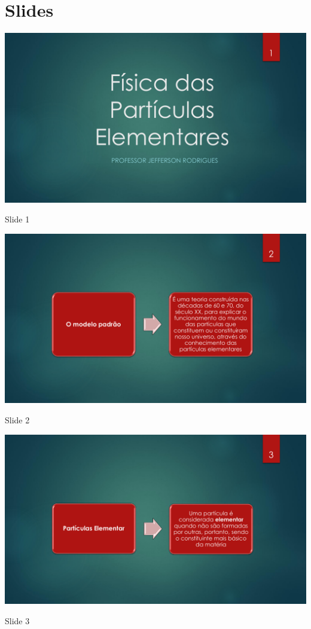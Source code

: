 \newpage

\section{Slides}\label{app_b:slides}

\begin{figura}[ht]
	\centering
	\includegraphics[width=0.9 \textwidth]{ApeD/slide_1}
	\caption{Slide 1}
	\label{fig:app:slide_1}
\end{figura}

\begin{figura}[ht]
	\centering
	\includegraphics[width=0.9 \textwidth]{ApeD/slide_2}
	\caption{Slide 2}
	\label{fig:app:slide_2}
\end{figura}

\begin{figura}[ht]
	\centering
	\includegraphics[width=0.9 \textwidth]{ApeD/slide_3}
	\caption{Slide 3}
	\label{fig:app:slide_3}
\end{figura}

